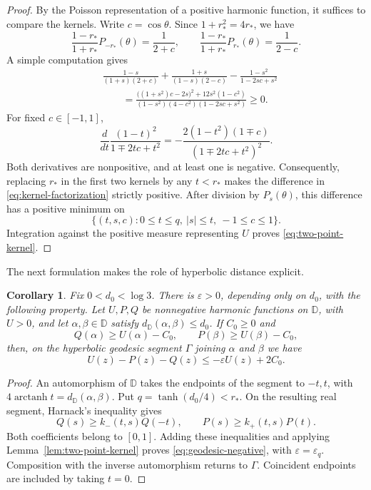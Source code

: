 \documentclass[12pt,letterpaper,reqno]{amsart}
\newtheorem{cor}[thm]{Corollary}
\theoremstyle{definition}
\numberwithin{equation}{section}
\newcommand{\D}{\mathbb D}
\begin{document}
	\begin{proof}
		By the Poisson representation of a positive harmonic function, it
		suffices to compare the kernels. Write $c=\cos\theta$. Since
		$1+r_*^2=4r_*$, we have
		\[
		\frac{1-r_*}{1+r_*}P_{-r_*}(\theta)=\frac1{2+c},
		\qquad
		\frac{1-r_*}{1+r_*}P_{r_*}(\theta)=\frac1{2-c}.
		\]
		A simple computation gives
		\begin{equation}\label{eq:kernel-factorization}
			\begin{split}
				&\frac{1-s}{(1+s)(2+c)}
				+\frac{1+s}{(1-s)(2-c)}
				-\frac{1-s^2}{1-2sc+s^2}\\
				&\qquad=
				\frac{\bigl((1+s^2)c-2s\bigr)^2+12s^2(1-c^2)}
				{(1-s^2)(4-c^2)(1-2sc+s^2)}
				\ge0.
			\end{split}
		\end{equation}
		For fixed $c\in[-1,1]$,
		\[
		\frac{d}{dt}\frac{(1-t)^2}{1\mp2tc+t^2}
		=-\frac{2(1-t^2)(1\mp c)}{(1\mp2tc+t^2)^2}.
		\]
		Both derivatives are nonpositive, and at least one is negative.
		Consequently, replacing $r_*$ in the first two kernels by any
		$t<r_*$ makes the difference in \eqref{eq:kernel-factorization}
		strictly positive. After division by $P_s(\theta)$, this difference
		has a positive minimum on
		\[
		\{(t,s,c):0\le t\le q,\ |s|\le t,\ -1\le c\le1\}.
		\]
		Integration against the positive measure representing $U$ proves
		\eqref{eq:two-point-kernel}.
	\end{proof}
	
	The next formulation makes the role of hyperbolic distance explicit.
	
	\begin{cor}\label{cor:geodesic-comparison}
		Fix $0<d_0<\log3$. There is $\varepsilon>0$, depending only on $d_0$,
		with the following property. Let $U,P,Q$ be nonnegative harmonic
		functions on $\D$, with $U>0$, and let $\alpha,\beta\in\D$ satisfy
		$d_{\D}(\alpha,\beta)\le d_0$. If $C_0\ge0$ and
		\[
		Q(\alpha)\ge U(\alpha)-C_0,
		\qquad
		P(\beta)\ge U(\beta)-C_0,
		\]
		then, on the hyperbolic geodesic segment $\Gamma$ joining $\alpha$ and $\beta$
		we have
		\begin{equation}\label{eq:geodesic-negative}
			U(z)-P(z)-Q(z)\le-\varepsilon U(z)+2C_0.
		\end{equation}
	\end{cor}
	
	\begin{proof}
		An automorphism of $\D$ takes the endpoints of the segment
		to $-t,t$, with
		$4\operatorname{arctanh}t=d_{\D}(\alpha,\beta)$. Put
		$q=\tanh(d_0/4)<r_*$. On the resulting real segment, Harnack's
		inequality gives
		\[
		Q(s)\ge k_-(t,s)Q(-t),
		\qquad
		P(s)\ge k_+(t,s)P(t).
		\]
		Both coefficients belong to $[0,1]$. Adding these inequalities and
		applying Lemma~\ref{lem:two-point-kernel} proves
		\eqref{eq:geodesic-negative}, with $\varepsilon=\varepsilon_q$.
		Composition with the inverse automorphism returns to $\Gamma$.
		Coincident endpoints are included by taking $t=0$.
	\end{proof}
	
\end{document}
